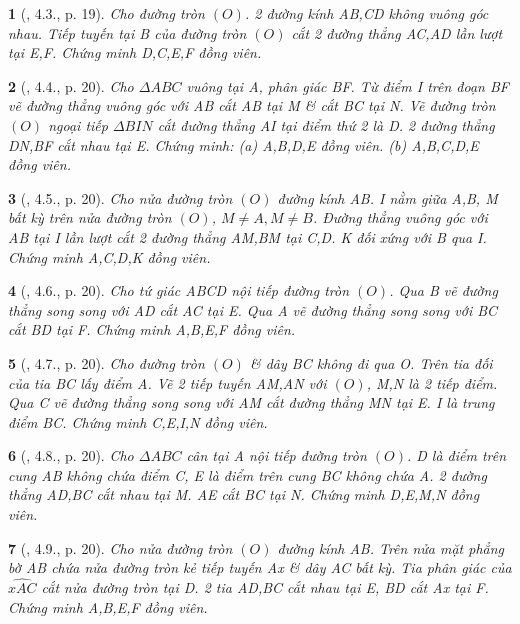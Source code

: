 \documentclass{article}
\newtheorem{baitoan}{}
\begin{document}
\begin{baitoan}[\cite{Thu_Chung_Viet_Minh_circ}, 4.3., p. 19]
	Cho đường tròn $(O)$. 2 đường kính AB,CD không vuông góc nhau. Tiếp tuyến tại B của đường tròn $(O)$ cắt 2 đường thẳng AC,AD lần lượt tại E,F. Chứng minh D,C,E,F đồng viên.
\end{baitoan}

\begin{baitoan}[\cite{Thu_Chung_Viet_Minh_circ}, 4.4., p. 20]
	Cho $\Delta ABC$ vuông tại A, phân giác BF. Từ điểm I trên đoạn BF vẽ đường thẳng vuông góc với AB cắt AB tại M \& cắt BC tại N. Vẽ đường tròn $(O)$ ngoại tiếp $\Delta BIN$ cắt đường thẳng AI tại điểm thứ 2 là D. 2 đường thẳng DN,BF cắt nhau tại E. Chứng minh: (a) A,B,D,E đồng viên. (b) A,B,C,D,E đồng viên.
\end{baitoan}

\begin{baitoan}[\cite{Thu_Chung_Viet_Minh_circ}, 4.5., p. 20]
	Cho nửa đường tròn $(O)$ đường kính AB. I nằm giữa A,B, M bất kỳ trên nửa đường tròn $(O)$, $M\ne A,M\ne B$. Đường thẳng vuông góc với AB tại I lần lượt cắt 2 đường thẳng AM,BM tại C,D. K đối xứng với B qua I. Chứng minh A,C,D,K đồng viên.
\end{baitoan}

\begin{baitoan}[\cite{Thu_Chung_Viet_Minh_circ}, 4.6., p. 20]
	Cho tứ giác ABCD nội tiếp đường tròn $(O)$. Qua B vẽ đường thẳng song song với AD cắt AC tại E. Qua A vẽ đường thẳng song song với BC cắt BD tại F. Chứng minh A,B,E,F đồng viên.
\end{baitoan}

\begin{baitoan}[\cite{Thu_Chung_Viet_Minh_circ}, 4.7., p. 20]
	Cho đường tròn $(O)$ \& dây BC không đi qua O. Trên tia đối của tia BC lấy điểm A. Vẽ 2 tiếp tuyến AM,AN với $(O)$, M,N là 2 tiếp điểm. Qua C vẽ đường thẳng song song với AM cắt đường thẳng MN tại E. I là trung điểm BC. Chứng minh C,E,I,N đồng viên.
\end{baitoan}

\begin{baitoan}[\cite{Thu_Chung_Viet_Minh_circ}, 4.8., p. 20]
	Cho $\Delta ABC$ cân tại A nội tiếp đường tròn $(O)$. D là điểm trên cung AB không chứa điểm C, E là điểm trên cung BC không chứa A. 2 đường thẳng AD,BC cắt nhau tại M. AE cắt BC tại N. Chứng minh D,E,M,N đồng viên.
\end{baitoan}

\begin{baitoan}[\cite{Thu_Chung_Viet_Minh_circ}, 4.9., p. 20]
	Cho nửa đường tròn $(O)$ đường kính AB. Trên nửa mặt phẳng bờ AB chứa nửa đường tròn kẻ tiếp tuyến Ax \& dây AC bất kỳ. Tia phân giác của $\widehat{xAC}$ cắt nửa đường tròn tại D. 2 tia AD,BC cắt nhau tại E, BD cắt Ax tại F. Chứng minh A,B,E,F đồng viên.
\end{baitoan}
\end{document}
